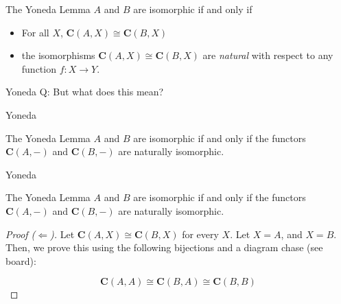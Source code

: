 \documentclass[tikz]{beamer}
\theoremstyle{definition}
\begin{document}
\begin{frame} 
\begin{block}{The Yoneda Lemma}
    $A$ and $B$ are isomorphic if and only if 
    \begin{itemize}
        \item For all $X$, $\mathbf{C}(A, X) \cong \mathbf{C}(B, X)$
        
        \item the isomorphisms $\mathbf{C}(A, X) \cong \mathbf{C}(B, X)$ are \textit{natural} with respect to any function $f : X \to Y$.
    \end{itemize}{}
\end{block}{}



\end{frame}
\begin{frame}{Yoneda}
    Q: But what does this mean?
    
\end{frame}
\begin{frame}{Yoneda}
    \begin{block}{The Yoneda Lemma}
        $A$ and $B$ are isomorphic if and only if the functors $\mathbf{C}(A, -) $ and $\mathbf{C}(B, -)$ are naturally isomorphic.
    \end{block}{}
\end{frame}

\begin{frame}{Yoneda}
    \begin{block}{The Yoneda Lemma}
        $A$ and $B$ are isomorphic if and only if the functors $\mathbf{C}(A, -) $ and $\mathbf{C}(B, -)$ are naturally isomorphic.
    \end{block}{}
    
    \begin{proof}[Proof ($\Leftarrow$)]
    
        Let $\mathbf{C}(A, X) \cong \mathbf{C}(B, X)$ for every $X$. Let $X = A$, and $X = B$. Then, we prove this using the following bijections and a diagram chase (see board): 
        
        \begin{equation*}
            \mathbf{C}(A, A) \cong \mathbf{C}(B, A) \cong \mathbf{C}(B, B)
        \end{equation*}{}
    \end{proof}
\end{frame}
\end{document}
